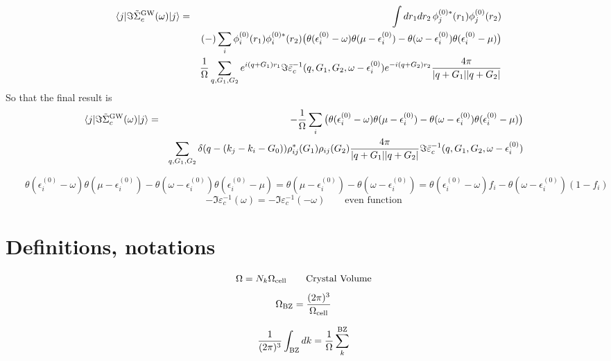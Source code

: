 \documentclass[fleqn]{article}
\begin{document}
\begin{eqnarray*}
  \quad
  \langle j | \Im \tilde{\Sigma}^{\rm GW}_c(\omega) | j \rangle
  &=& \int dr_1 dr_2 \, \phi_j^{(0)*}(r_1) \phi_j^{(0)}(r_2)
  \\ && (-) \sum_i \phi_i^{(0)}(r_1) \phi_i^{(0)*}(r_2)
  \big( \theta(\epsilon_i^{(0)}-\omega) \theta(\mu-\epsilon_i^{(0)})
  - \theta(\omega-\epsilon_i^{(0)}) \theta(\epsilon_i^{(0)}-\mu) \big)
  \\ &&
      \frac{1}{\Omega} \sum_{q,G_1,G_2}
      e^{i(q+G_1)r_1} \Im \bar\varepsilon^{-1}_c(q,G_1,G_2,\omega-\epsilon_i^{(0)}) e^{-i(q+G_2)r_2}
      \frac{4\pi}{|q+G_1||q+G_2|}
\end{eqnarray*}
So that the final result is
\begin{eqnarray*}
  \langle j | \Im \tilde{\Sigma}^{\rm GW}_c(\omega) | j \rangle &=&
  - \frac{1}{\Omega} \sum_i   \big( \theta(\epsilon_i^{(0)}-\omega) \theta(\mu-\epsilon_i^{(0)})
  - \theta(\omega-\epsilon_i^{(0)}) \theta(\epsilon_i^{(0)}-\mu) \big)
  \\ &&
  \sum_{q,G_1,G_2} \delta(q - (k_j-k_i-G_0))
  \rho^*_{ij}(G_1) \rho_{ij}(G_2) \frac{4\pi}{|q+G_1||q+G_2|}
  \Im \bar\varepsilon^{-1}_c(q,G_1,G_2,\omega-\epsilon_i^{(0)})
\end{eqnarray*}

\[
  \qquad
  \theta(\epsilon_i^{(0)}-\omega) \theta(\mu-\epsilon_i^{(0)})
  - \theta(\omega-\epsilon_i^{(0)}) \theta(\epsilon_i^{(0)}-\mu) =
  \theta(\mu-\epsilon_i^{(0)}) - \theta(\omega-\epsilon_i^{(0)}) =
  \theta(\epsilon_i^{(0)}-\omega) f_i - \theta(\omega-\epsilon_i^{(0)}) (1- f_i)
\]
\[
  - \Im  \varepsilon_c^{-1}(\omega) = -\Im \varepsilon_c^{-1}(-\omega)
  \qquad\textrm{even function}
\]

\appendix


\section{Definitions, notations}

\[
\Omega = N_k \Omega_{\rm cell} \qquad \textrm{Crystal Volume}
\]
\[
\Omega_{\rm BZ} = \frac{(2\pi)^3}{\Omega_{\rm cell}}
\]

\[
\frac{1}{(2 \pi)^3} \int_{\rm BZ} dk = \frac{1}{\Omega} \sum_k^{\rm BZ}
\]
\end{document}
